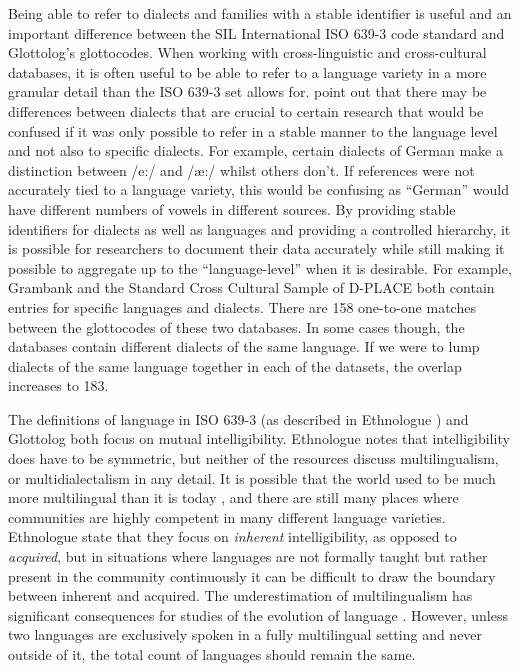 \documentclass[unnumsec,webpdf,modern,medium]{oup-authoring-template}
\begin{document}

Being able to refer to dialects and families with a stable identifier is useful and an important difference between the SIL International ISO 639-3 code standard and Glottolog's glottocodes. When working with cross-linguistic and cross-cultural databases, it is often useful to be able to refer to a language variety in a more granular detail than the ISO 639-3 set allows for. \citet{nordhoff2011glottolog} point out that there may be differences between dialects that are crucial to certain research that would be confused if it was only possible to refer in a stable manner to the language level and not also to specific dialects. For example, certain dialects of German make a distinction between /e:/ and /æ:/ whilst others don't. If references were not accurately tied to a language variety, this would be confusing as ``German'' would have different numbers of vowels in different sources. By providing stable identifiers for dialects as well as languages and providing a controlled hierarchy, it is possible for researchers to document their data accurately while still making it possible to aggregate up to the ``language-level'' when it is desirable. For example, Grambank and the Standard Cross Cultural Sample of D-PLACE both contain entries for specific languages and dialects. There are 158 one-to-one matches between the glottocodes of these two databases. In some cases though, the databases contain different dialects of the same language. If we were to lump dialects of the same language together in each of the datasets, the overlap increases to 183.

The definitions of language in ISO 639-3 (as described in Ethnologue \citep{ethnologue2019lgident}) and Glottolog both focus on mutual intelligibility. Ethnologue notes that intelligibility does have to be symmetric, but neither of the resources discuss multilingualism, or multidialectalism in any detail. It is possible that the world used to be much more multilingual than it is today \citep{evans2017did}, and there are still many places where communities are highly competent in many different language varieties. Ethnologue state that they focus on \emph{inherent} intelligibility, as opposed to \emph{acquired}, but in situations where languages are not formally taught but rather present in the community continuously it can be difficult to draw the boundary between inherent and acquired. The underestimation of multilingualism has significant consequences for studies of the evolution of language \citep{roberts2013evolutionary}. However, unless two languages are exclusively spoken in a fully multilingual setting and never outside of it, the total count of languages should remain the same. 
\end{document}
